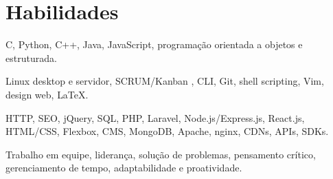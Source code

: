 \section{Habilidades}
{C, Python, C++, Java, JavaScript, programação orientada a objetos e estruturada.}

{Linux desktop e servidor, SCRUM/Kanban , CLI, Git, shell scripting, Vim, design web, {\LaTeX}.}

{HTTP, SEO, jQuery, SQL, PHP, Laravel, Node.js/Express.js, React.js, HTML/CSS, Flexbox, CMS, MongoDB, Apache, nginx, CDNs, APIs, SDKs.}

{Trabalho em equipe, liderança, solução de problemas, pensamento crítico, gerenciamento de tempo, adaptabilidade e proatividade.}
